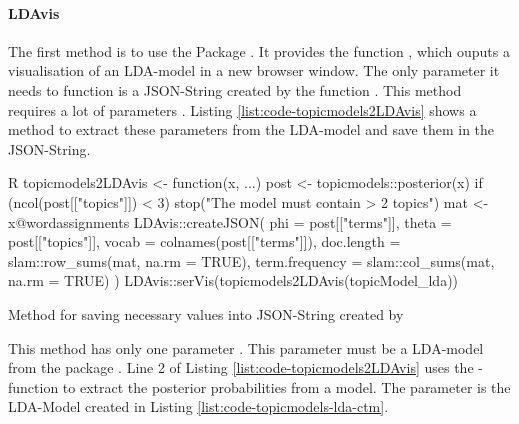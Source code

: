 \paragraph{LDAvis} The first method is to use the Package . It provides the function  \cite[6]{Sievert2015-LDAvis}, which ouputs a visualisation of an LDA-model in a new browser window. The only parameter it needs to function is a JSON-String created by the function . This method requires a lot of parameters \cite[2]{Sievert2015-LDAvis}. Listing \ref{list:code-topicmodels2LDAvis} shows a method to extract these parameters from the LDA-model and save them in the JSON-String.
\begin{listing}
    \begin{code}{R}
        topicmodels2LDAvis <- function(x, ...){
            post <- topicmodels::posterior(x)
            if (ncol(post[["topics"]]) < 3) stop("The model must contain > 2 topics")
                mat <- x@wordassignments
            LDAvis::createJSON(
                phi = post[["terms"]], 
                theta = post[["topics"]],
                vocab = colnames(post[["terms"]]),
                doc.length = slam::row_sums(mat, na.rm = TRUE),
                term.frequency = slam::col_sums(mat, na.rm = TRUE)
            )
        }
        LDAvis::serVis(topicmodels2LDAvis(topicModel_lda))
    \end{code}
    \caption{Method for saving necessary values into JSON-String created by }
    \label{list:code-topicmodels2LDAvis}
\end{listing}
This method has only one parameter . This parameter must be a LDA-model from the package . Line 2 of Listing \ref{list:code-topicmodels2LDAvis} uses the -function to extract the posterior probabilities from a model. The parameter  is the LDA-Model created in Listing \ref{list:code-topicmodels-lda-ctm}.

